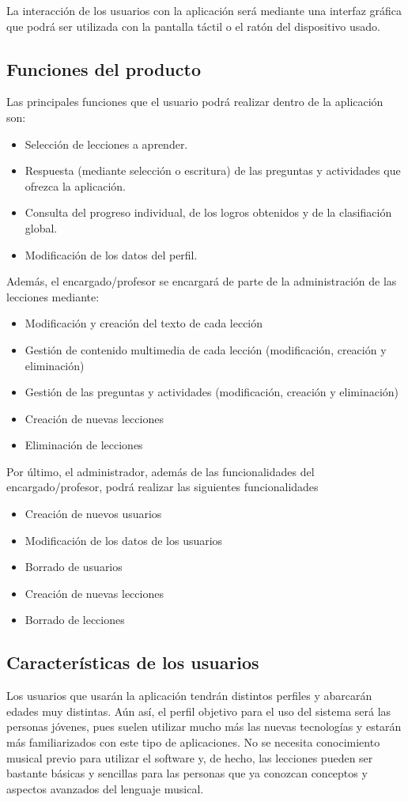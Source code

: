 La interacción de los usuarios con la aplicación será mediante una interfaz gráfica que podrá ser utilizada con la pantalla táctil o el ratón del dispositivo usado.


\subsection{Funciones del producto}
Las principales funciones que el usuario podrá realizar dentro de la aplicación son:
\begin{itemize}
\item Selección de lecciones a aprender.
\item Respuesta (mediante selección o escritura) de las preguntas y actividades que ofrezca la aplicación.
\item Consulta del progreso individual, de los logros obtenidos y de la clasifiación global.
\item Modificación de los datos del perfil.
\end {itemize}

Además, el encargado/profesor se encargará de parte de la administración de las lecciones mediante:
\begin{itemize}
    \item Modificación y creación del texto de cada lección
    \item Gestión de contenido multimedia de cada lección (modificación, creación y eliminación)
    \item Gestión de las preguntas y actividades (modificación, creación y eliminación)
    \item Creación de nuevas lecciones
    \item Eliminación de lecciones
\end{itemize}

Por último, el administrador, además de las funcionalidades del encargado/profesor, podrá realizar las siguientes funcionalidades
\begin{itemize}
    \item Creación de nuevos usuarios
    \item Modificación de los datos de los usuarios
    \item Borrado de usuarios
    \item Creación de nuevas lecciones
    \item Borrado de lecciones
\end{itemize}

\subsection{Características de los usuarios}
Los usuarios que usarán la aplicación tendrán distintos perfiles y abarcarán edades muy distintas. Aún así,
el perfil objetivo para el uso del sistema será las personas jóvenes, pues suelen utilizar mucho más las nuevas tecnologías
y estarán más familiarizados con este tipo de aplicaciones. No se necesita conocimiento musical previo para utilizar el software y,
de hecho, las lecciones pueden ser bastante básicas y sencillas para las personas que ya conozcan conceptos y aspectos avanzados del lenguaje musical.


